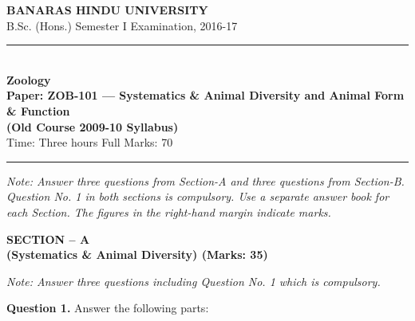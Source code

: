 \documentclass[11pt,a4paper]{article}
\begin{document}
\begin{center}
  {\large\bfseries BANARAS HINDU UNIVERSITY}\\[2pt]
  {\normalsize B.Sc. (Hons.) Semester I Examination, 2016-17}\\[6pt]
  \rule{0.8\linewidth}{0.5pt}\\[6pt]
  {\large\bfseries Zoology}\\[4pt]
  {\large\bfseries Paper: ZOB-101 --- Systematics \& Animal Diversity and Animal Form \& Function}\\[2pt]
  {\normalsize   \textbf{(Old Course 2009-10 Syllabus)}}\\[4pt]
  {\normalsize Time: Three hours \hfill Full Marks: 70}
\end{center}

\rule{\linewidth}{0.4pt}

\smallskip



\noindent   \textit{Note: Answer three questions from Section-A and three questions from Section-B. Question No. 1 in both sections is compulsory. Use a separate answer book for each Section. The figures in the right-hand margin indicate marks.}

\bigskip

\begin{center}
   \textbf{SECTION -- A} \\
   \textbf{(Systematics \& Animal Diversity) (Marks: 35)}
\end{center}

\smallskip



\noindent   \textit{Note: Answer three questions including Question No. 1 which is compulsory.}

\medskip


\noindent   \textbf{Question 1.} Answer the following parts:
\end{document}
